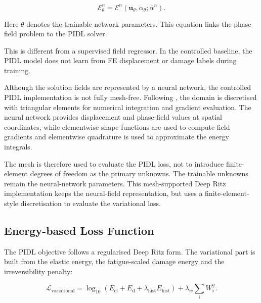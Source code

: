 \begin{equation}
    \mathcal{E}_{\theta}^{n}
    =
    \mathcal{E}^{n}
    \left(
    \mathbf{u}_{\theta},
    \alpha_{\theta};
    \bar{\alpha}^{n}
    \right).
    \label{eq:c3_neural_energy}
\end{equation}

Here $\theta$ denotes the trainable network parameters. This equation links the phase-field problem to the PIDL solver.

This is different from a supervised field regressor. In the controlled baseline, the PIDL model does not learn from FE displacement or damage labels during training.


Although the solution fields are represented by a neural network, the controlled PIDL implementation is not fully mesh-free. Following \citet{Manav2024cmame}, the domain is discretised with triangular elements for numerical integration and gradient evaluation. The neural network provides displacement and phase-field values at spatial coordinates, while elementwise shape functions are used to compute field gradients and elementwise quadrature is used to approximate the energy integrals.

The mesh is therefore used to evaluate the PIDL loss, not to introduce finite-element degrees of freedom as the primary unknowns. The trainable unknowns remain the neural-network parameters. This mesh-supported Deep Ritz implementation keeps the neural-field representation, but uses a finite-element-style discretisation to evaluate the variational loss.

\subsection{Energy-based Loss Function}
\label{subsec:c3_physics_loss}

The PIDL objective follows a regularised Deep Ritz form. The variational part is built from the elastic energy, the fatigue-scaled damage energy and the irreversibility penalty:

\begin{equation}
    \mathcal{L}_{\mathrm{variational}}
    =
    \log_{10}
    \left(
    E_{\mathrm{el}}
    +
    E_{\mathrm{d}}
    +
    \lambda_{\mathrm{hist}}E_{\mathrm{hist}}
    \right)
    +
    \lambda_w
    \sum_i W_i^2 .
    \label{eq:c3_pidl_loss}
\end{equation}


